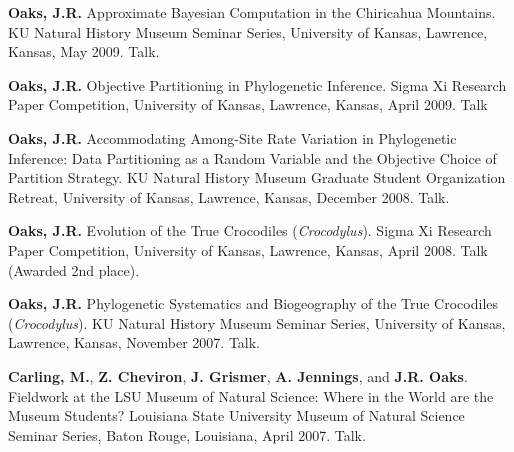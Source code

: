 \myHangIndent
{\bf Oaks, J.R.}
Approximate Bayesian Computation in the Chiricahua Mountains.
KU Natural History Museum Seminar Series, University of Kansas, Lawrence,
Kansas, May 2009.
Talk.

\myHangIndent
{\bf Oaks, J.R.}
Objective Partitioning in Phylogenetic Inference.
Sigma Xi Research Paper Competition, University of Kansas, Lawrence, Kansas,
April 2009.
Talk

\myHangIndent
{\bf Oaks, J.R.}
Accommodating Among-Site Rate Variation in Phylogenetic Inference: Data
Partitioning as a Random Variable and the Objective Choice of Partition
Strategy.
KU Natural History Museum Graduate Student Organization Retreat, University of
Kansas, Lawrence, Kansas, December 2008.
Talk.

\myHangIndent
{\bf Oaks, J.R.}
Evolution of the True Crocodiles (\emph{Crocodylus}).
Sigma Xi Research Paper Competition, University of Kansas, Lawrence, Kansas, April 2008.
Talk (Awarded 2nd place).

\myHangIndent
{\bf Oaks, J.R.}
Phylogenetic Systematics and Biogeography of the True Crocodiles
(\emph{Crocodylus}).
KU Natural History Museum Seminar Series, University of Kansas, Lawrence,
Kansas, November 2007.
Talk.

\myHangIndent
{\bf Carling, M.}, {\bf Z. Cheviron}, {\bf J. Grismer}, {\bf A. Jennings}, and
{\bf J.R. Oaks}.
Fieldwork at the LSU Museum of Natural Science: Where in the World are the
Museum Students?
Louisiana State University Museum of Natural Science Seminar Series, Baton
Rouge, Louisiana, April 2007.
Talk.

